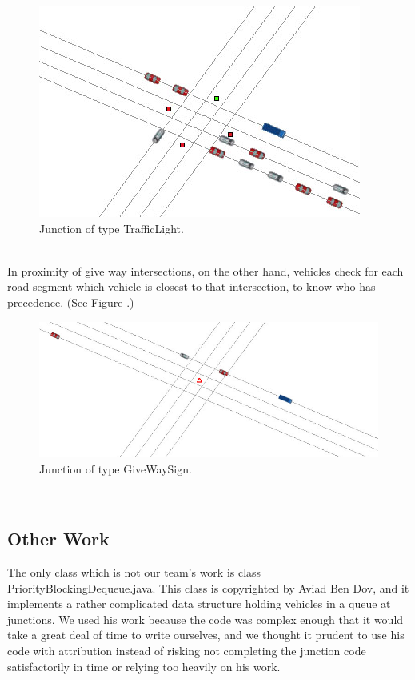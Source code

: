 \documentclass[11pt]{article}
\begin{document}
\begin{enumerate}
\begin{figure}[H]
\begin{center}
\includegraphics[scale=0.4]{traffic_light_junction}
\caption{Junction of type TrafficLight.}
\end{center}
\end{figure}

\\
In proximity of give way intersections, on the other hand, vehicles check for each road segment which vehicle is closest to that intersection, to know who has precedence. (See Figure .)
\\
\begin{figure}[H]
\begin{center}
\includegraphics[scale=0.3]{give_way_junction}
\caption{Junction of type GiveWaySign.}
\end{center}
\end{figure}
\\


\subsection{Other Work}

The only class which is not our team\textquoteright s work is class PriorityBlockingDequeue.java. This class is copyrighted by Aviad Ben Dov, and it implements a rather complicated data structure holding vehicles in a queue at junctions. We used his work because the code was complex enough that it would take a great deal of time to write ourselves, and we thought it prudent to use his code with attribution instead of risking not completing the junction code satisfactorily in time or relying too heavily on his work.




\end{enumerate}
\end{document}
